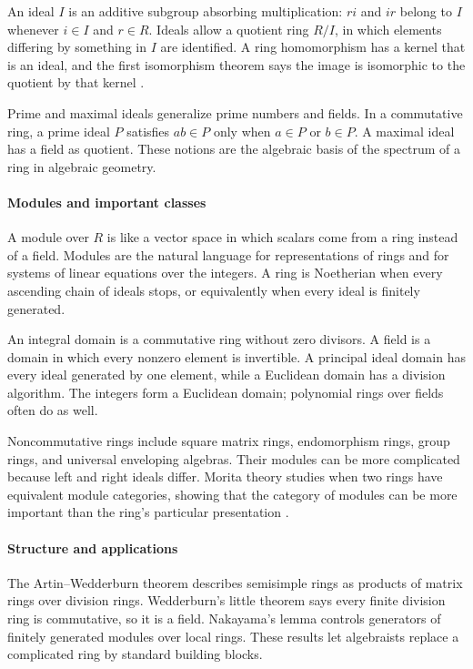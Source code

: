 An ideal $I$ is an additive subgroup absorbing multiplication: $r i$ and $i r$ belong to $I$ whenever $i\in I$ and $r\in R$. Ideals allow a quotient ring $R/I$, in which elements differing by something in $I$ are identified. A ring homomorphism has a kernel that is an ideal, and the first isomorphism theorem says the image is isomorphic to the quotient by that kernel \cite{ring_ref1}.

Prime and maximal ideals generalize prime numbers and fields. In a commutative ring, a prime ideal $P$ satisfies $ab\in P$ only when $a\in P$ or $b\in P$. A maximal ideal has a field as quotient. These notions are the algebraic basis of the spectrum of a ring in algebraic geometry.

\paragraph{Modules and important classes}
A module over $R$ is like a vector space in which scalars come from a ring instead of a field. Modules are the natural language for representations of rings and for systems of linear equations over the integers. A ring is Noetherian when every ascending chain of ideals stops, or equivalently when every ideal is finitely generated.

An integral domain is a commutative ring without zero divisors. A field is a domain in which every nonzero element is invertible. A principal ideal domain has every ideal generated by one element, while a Euclidean domain has a division algorithm. The integers form a Euclidean domain; polynomial rings over fields often do as well.

Noncommutative rings include square matrix rings, endomorphism rings, group rings, and universal enveloping algebras. Their modules can be more complicated because left and right ideals differ. Morita theory studies when two rings have equivalent module categories, showing that the category of modules can be more important than the ring's particular presentation \cite{ring_ref3}.

\paragraph{Structure and applications}
The Artin--Wedderburn theorem describes semisimple rings as products of matrix rings over division rings. Wedderburn's little theorem says every finite division ring is commutative, so it is a field. Nakayama's lemma controls generators of finitely generated modules over local rings. These results let algebraists replace a complicated ring by standard building blocks.

